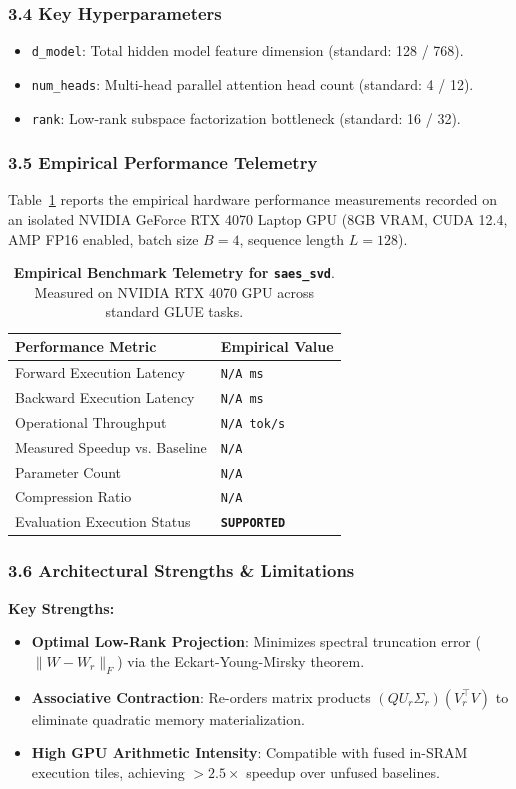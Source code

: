 \subsubsection*{3.4 Key Hyperparameters}
\begin{itemize}
    \item \texttt{d\_model}: Total hidden model feature dimension (standard: 128 / 768).
    \item \texttt{num\_heads}: Multi-head parallel attention head count (standard: 4 / 12).
    \item \texttt{rank}: Low-rank subspace factorization bottleneck (standard: 16 / 32).
\end{itemize}

\subsubsection*{3.5 Empirical Performance Telemetry}
Table~\ref{tab:telemetry_saes_svd} reports the empirical hardware performance measurements recorded on an isolated NVIDIA GeForce RTX 4070 Laptop GPU (8GB VRAM, CUDA 12.4, AMP FP16 enabled, batch size $B=4$, sequence length $L=128$).

\begin{table}[h]
\centering
\small
\caption{\textbf{Empirical Benchmark Telemetry for \texttt{saes\_svd}}. Measured on NVIDIA RTX 4070 GPU across standard GLUE tasks.}
\label{tab:telemetry_saes_svd}
\begin{tabularx}{\columnwidth}{lX}
\toprule
\textbf{Performance Metric} & \textbf{Empirical Value} \\
\midrule
Forward Execution Latency & \texttt{N/A ms} \\
Backward Execution Latency & \texttt{N/A ms} \\
Operational Throughput & \texttt{N/A tok/s} \\
Measured Speedup vs. Baseline & \texttt{N/A} \\
Parameter Count & \texttt{N/A} \\
Compression Ratio & \texttt{N/A} \\
Evaluation Execution Status & \textbf{\texttt{SUPPORTED}} \\
\bottomrule
\end{tabularx}
\end{table}

\subsubsection*{3.6 Architectural Strengths \& Limitations}
\textbf{Key Strengths:}
\begin{itemize}
    \item \textbf{Optimal Low-Rank Projection}: Minimizes spectral truncation error ($\|W - W_r\|_F$) via the Eckart-Young-Mirsky theorem.
    \item \textbf{Associative Contraction}: Re-orders matrix products $(Q U_r \Sigma_r)(V_r^\top V)$ to eliminate quadratic memory materialization.
    \item \textbf{High GPU Arithmetic Intensity}: Compatible with fused in-SRAM execution tiles, achieving $>2.5\times$ speedup over unfused baselines.
\end{itemize}

